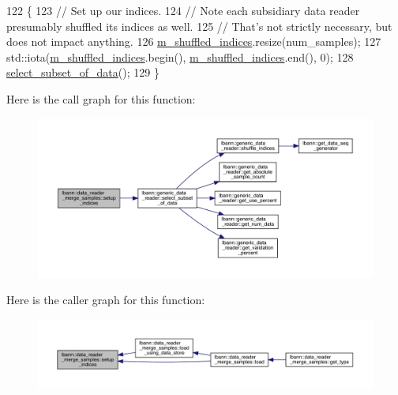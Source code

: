 \begin{DoxyCode}
122                                                              \{
123   \textcolor{comment}{// Set up our indices.}
124   \textcolor{comment}{// Note each subsidiary data reader presumably shuffled its indices as well.}
125   \textcolor{comment}{// That's not strictly necessary, but does not impact anything.}
126   \hyperlink{classlbann_1_1generic__data__reader_aaab6aeff67ffff1c689336851fec2c57}{m\_shuffled\_indices}.resize(num\_samples);
127   std::iota(\hyperlink{classlbann_1_1generic__data__reader_aaab6aeff67ffff1c689336851fec2c57}{m\_shuffled\_indices}.begin(), \hyperlink{classlbann_1_1generic__data__reader_aaab6aeff67ffff1c689336851fec2c57}{m\_shuffled\_indices}.end(), 0);
128   \hyperlink{classlbann_1_1generic__data__reader_aa28fdeeb6af492540f507e49adff5d6c}{select\_subset\_of\_data}();
129 \}
\end{DoxyCode}
Here is the call graph for this function\+:\nopagebreak
\begin{figure}[H]
\begin{center}
\leavevmode
\includegraphics[width=350pt]{classlbann_1_1data__reader__merge__samples_ae5fe8d5cf8eb1a6aa715579d329a620e_cgraph}
\end{center}
\end{figure}
Here is the caller graph for this function\+:\nopagebreak
\begin{figure}[H]
\begin{center}
\leavevmode
\includegraphics[width=350pt]{classlbann_1_1data__reader__merge__samples_ae5fe8d5cf8eb1a6aa715579d329a620e_icgraph}
\end{center}
\end{figure}


